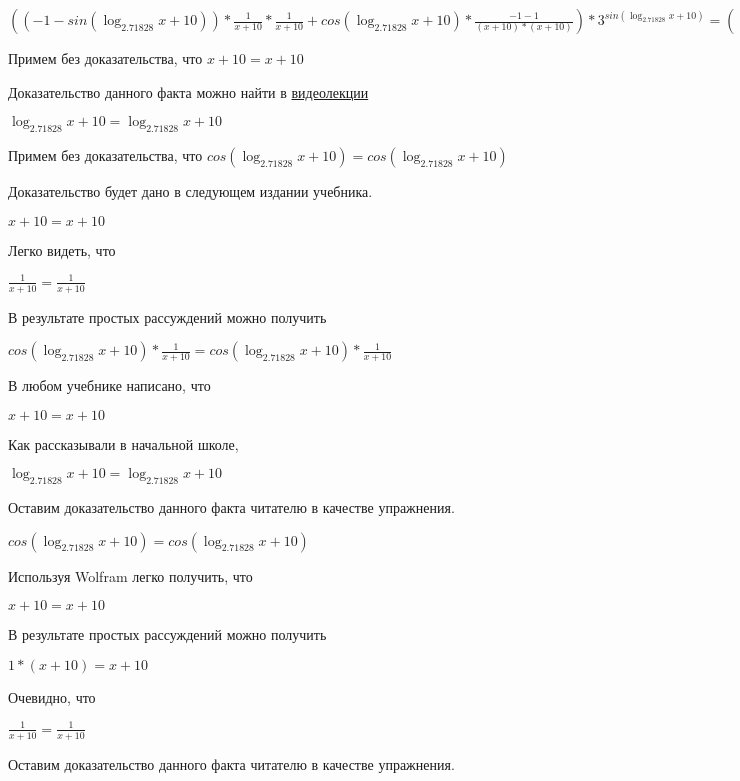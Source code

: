 \documentclass[12pt,a4paper,fleqn]{article}
\theoremstyle{definition}
\begin{document}
$(( -1  - sin(\log_{ 2.71828 }{ x  +  10 })) * \frac{ 1 }{ x  +  10 }
 * \frac{ 1 }{ x  +  10 }
 + cos(\log_{ 2.71828 }{ x  +  10 }) * \frac{ -1  -  1 }{( x  +  10 ) * ( x  +  10 )}
) * { 3 }^{sin(\log_{ 2.71828 }{ x  +  10 })} = (( -1  - sin(\log_{ 2.71828 }{ x  +  10 })) * \frac{ 1 }{ x  +  10 }
 * \frac{ 1 }{ x  +  10 }
 + cos(\log_{ 2.71828 }{ x  +  10 }) * \frac{ -1  -  1 }{( x  +  10 ) * ( x  +  10 )}
) * { 3 }^{sin(\log_{ 2.71828 }{ x  +  10 })}$

Примем без доказательства, что
$ x  +  10  =  x  +  10 $

Доказательство данного факта можно найти в \href{https://www.youtube.com/watch?v=dQw4w9WgXcQ}{видеолекции}

$\log_{ 2.71828 }{ x  +  10 } = \log_{ 2.71828 }{ x  +  10 }$

Примем без доказательства, что
$cos(\log_{ 2.71828 }{ x  +  10 }) = cos(\log_{ 2.71828 }{ x  +  10 })$

Доказательство будет дано в следующем издании учебника.

$ x  +  10  =  x  +  10 $

Легко видеть, что

$\frac{ 1 }{ x  +  10 }
 = \frac{ 1 }{ x  +  10 }
$

В результате простых рассуждений можно получить

$cos(\log_{ 2.71828 }{ x  +  10 }) * \frac{ 1 }{ x  +  10 }
 = cos(\log_{ 2.71828 }{ x  +  10 }) * \frac{ 1 }{ x  +  10 }
$

В любом учебнике написано, что

$ x  +  10  =  x  +  10 $

Как рассказывали в начальной школе,

$\log_{ 2.71828 }{ x  +  10 } = \log_{ 2.71828 }{ x  +  10 }$

Оставим доказательство данного факта читателю в качестве упражнения.

$cos(\log_{ 2.71828 }{ x  +  10 }) = cos(\log_{ 2.71828 }{ x  +  10 })$

Используя Wolfram легко получить, что

$ x  +  10  =  x  +  10 $

В результате простых рассуждений можно получить

$ 1  * ( x  +  10 ) =  x  +  10 $

Очевидно, что

$\frac{ 1 }{ x  +  10 }
 = \frac{ 1 }{ x  +  10 }
$

Оставим доказательство данного факта читателю в качестве упражнения.
\end{document}
